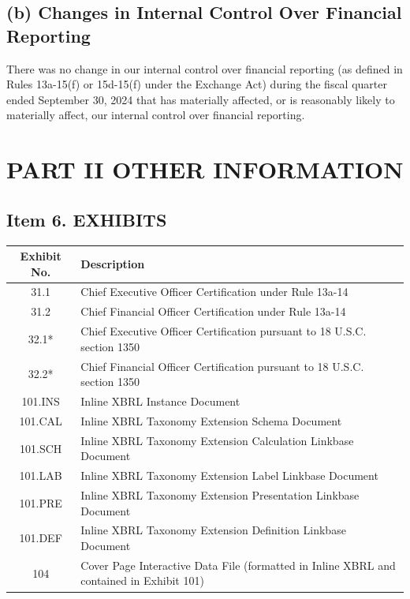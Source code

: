\documentclass{article}
\begin{document}
\subsection*{(b) Changes in Internal Control Over Financial Reporting}
There was no change in our internal control over financial reporting (as defined in Rules 13a-15(f) or 15d-15(f) under the Exchange Act) during the fiscal quarter ended September 30, 2024 that has materially affected, or is reasonably likely to materially affect, our internal control over financial reporting.



\section{PART II OTHER INFORMATION}

\subsection{Item 6. EXHIBITS}
\begin{table}[h!]
\centering
\begin{tabular}{|c|l|}
\hline
\textbf{Exhibit No.} & \textbf{Description} \\
\hline
31.1 & Chief Executive Officer Certification under Rule 13a-14 \\
31.2 & Chief Financial Officer Certification under Rule 13a-14 \\
32.1* & Chief Executive Officer Certification pursuant to 18 U.S.C. section 1350 \\
32.2* & Chief Financial Officer Certification pursuant to 18 U.S.C. section 1350 \\
101.INS & Inline XBRL Instance Document \\
101.CAL & Inline XBRL Taxonomy Extension Schema Document \\
101.SCH & Inline XBRL Taxonomy Extension Calculation Linkbase Document \\
101.LAB & Inline XBRL Taxonomy Extension Label Linkbase Document \\
101.PRE & Inline XBRL Taxonomy Extension Presentation Linkbase Document \\
101.DEF & Inline XBRL Taxonomy Extension Definition Linkbase Document \\
104 & Cover Page Interactive Data File (formatted in Inline XBRL and contained in Exhibit 101) \\
\hline
\end{tabular}
\end{table}
\end{document}
